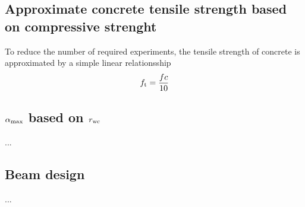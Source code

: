 \subsection{Approximate concrete tensile strength based on compressive strenght}
To reduce the number of required experiments, the tensile strength of concrete is approximated by a simple linear relationsship
\begin{align}
f_{\text{t}} = \frac{fc}{10} \label{eq:tensilstrength}
\end{align}
\subsection{$\alpha_{\text{max}}$ based on $r_{\text{wc}}$}
...
\subsection{Beam design}
...